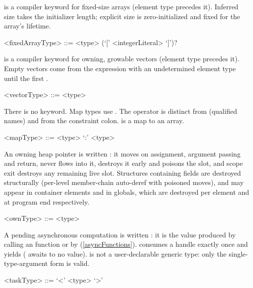 \documentclass[makeidx]{article}
\begin{document}
\LMHash{}%
 is a compiler keyword for fixed-size arrays (element type
precedes it). Inferred size takes the initializer length; explicit
size is zero-initialized and fixed for the array's lifetime.

\begin{grammar}
<fixedArrayType> ::= <type> \ARR{} (`[' <integerLiteral> `]')?
\end{grammar}

\LMHash{}%
 is a compiler keyword for owning, growable vectors (element
type precedes it). Empty vectors come from the  expression
with an undetermined element type until the first .

\begin{grammar}
<vectorType> ::= <type> \VEC{}
\end{grammar}

\LMHash{}%
There is no  keyword. Map types use .
The \code{:} operator is distinct from \code{::} (qualified names) and
from the  constraint colon.
 is a map to an array.

\begin{grammar}
<mapType> ::= <type> `:' <type>
\end{grammar}

\LMHash{}%
An owning heap pointer is written : it moves on assignment,
argument passing and return,  never flows into it,
 destroys it early and poisons the slot, and scope exit
destroys any remaining live  slot. Structures containing
 fields are destroyed structurally (per-level member-chain
auto-deref with poisoned moves), and  may appear in
container elements and in globals, which are destroyed per element
and at program end respectively.

\begin{grammar}
<ownType> ::= \OWN{} <type>
\end{grammar}

\LMHash{}%
A pending asynchronous computation is written : it is the
value produced by calling an  function or by 
(\ref{asyncFunctions}).  consumes a  handle
exactly once and yields  ( awaits to no
value).  is not a user-declarable generic type: only the
single-type-argument form is valid.

\begin{grammar}
<taskType> ::=  `<' <type> `>'
\end{grammar}
\end{document}
